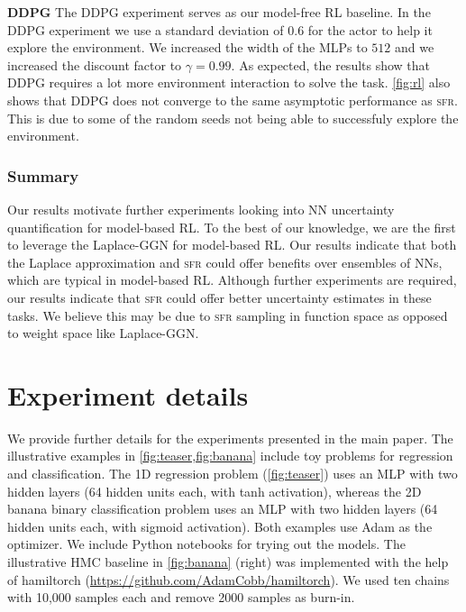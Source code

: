 \documentclass{article}
\newcommand{\our}{\textsc{sfr}\xspace}
\begin{document}
\textbf{DDPG}
The DDPG experiment serves as our model-free RL baseline.
In the DDPG experiment we use a standard deviation of $0.6$ for the actor to help it explore
the environment.
We increased the width of the MLPs to $512$ and we increased the discount factor to $\gamma=0.99$.
As expected, the results show that DDPG requires a lot more environment interaction to solve the task.
\cref{fig:rl} also shows that DDPG does not converge to the same asymptotic performance as \our.
This is due to some of the random seeds not being able to successfuly explore the environment.

\subsubsection{Summary}
Our results motivate further experiments looking into NN uncertainty quantification
for model-based RL.
To the best of our knowledge, we are the first to leverage the Laplace-GGN for model-based RL.
Our results indicate that both the Laplace approximation and \our could offer benefits over
ensembles of NNs, which are typical in model-based RL.
Although further experiments are required, our results indicate that \our could offer
better uncertainty estimates in these tasks.
We believe this may be due to \our sampling in function space as opposed to weight space like
Laplace-GGN.


\section{Experiment details}
\label{app:experiments}
%
We provide further details for the experiments presented in the main paper. The illustrative examples in \cref{fig:teaser,fig:banana} include toy problems for regression and classification. The 1D regression problem (\cref{fig:teaser}) uses an MLP with two hidden layers (64 hidden units each, with tanh activation), whereas the 2D banana binary classification problem uses an MLP with two hidden layers (64 hidden units each, with sigmoid activation). Both examples use Adam as the optimizer. We include Python notebooks for trying out the models. The illustrative HMC baseline in \cref{fig:banana} (right) was implemented with the help of hamiltorch (\url{https://github.com/AdamCobb/hamiltorch}). We used ten chains with 10,000 samples each and remove 2000 samples as burn-in.
\end{document}
